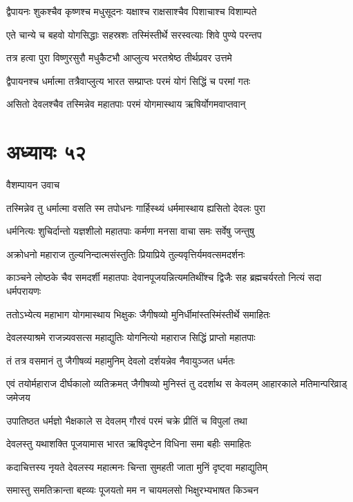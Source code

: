\twolineshloka
{द्वैपायनः शुकश्चैव कृष्णश्च मधुसूदनः}
{यक्षाश्च राक्षसाश्चैव पिशाचाश्च विशाम्पते}


\twolineshloka
{एते चान्ये च बहवो योगसिद्धाः सहस्रशः}
{तस्मिंस्तीर्थे सरस्वत्याः शिवे पुण्ये परन्तप}


\twolineshloka
{तत्र हत्वा पुरा विष्णुरसुरौ मधुकैटभौ}
{आप्लुत्य भरतश्रेष्ठ तीर्थप्रवर उत्तमे}


\twolineshloka
{द्वैपायनश्च धर्मात्मा तत्रैवाप्लुत्य भारत}
{सम्प्राप्तः परमं योगं सिद्धिं च परमां गतः}


\twolineshloka
{असितो देवलश्चैव तस्मिन्नेव महातपाः}
{परमं योगमास्थाय ऋषिर्योगमवाप्तवान्}


\chapter{अध्यायः ५२}
\twolineshloka
{वैशम्पायन उवाच}
{}


\twolineshloka
{तस्मिन्नेव तु धर्मात्मा वसति स्म तपोधनः}
{गार्हिस्थ्यं धर्ममास्थाय ह्यसितो देवलः पुरा}


\twolineshloka
{धर्मनित्यः शुचिर्दान्तो यज्ञशीलो महातपाः}
{कर्मणा मनसा वाचा समः सर्वेषु जन्तुषु}


\twolineshloka
{अक्रोधनो महाराज तुल्यनिन्दात्मसंस्तुतिः}
{प्रियाप्रिये तुल्यवृत्तिर्यमवत्समदर्शनः}


\threelineshloka
{काञ्चने लोष्ठके चैव समदर्शी महातपाः}
{देवानपूजयन्नित्यमतिथींश्च द्विजैः सह}
{ब्रह्मचर्यरतो नित्यं सदा धर्मपरायणः}


\twolineshloka
{ततोऽभ्येत्य महाभाग योगमास्थाय भिक्षुकः}
{जैगीषव्यो मुनिर्धीमांस्तस्मिंस्तीर्थे समाहितः}


\twolineshloka
{देवलस्याश्रमे राजन्न्यवसत्स महाद्युतिः}
{योगनित्यो महाराज सिद्धिं प्राप्तो महातपाः}


\twolineshloka
{तं तत्र वसमानं तु जैगीषव्यं महामुनिम्}
{देवलो दर्शयन्नेव नैवायुञ्जत धर्मतः}


एवं तयोर्महाराज दीर्घकालो व्यतिक्रमत्
\twolineshloka
{जैगीषव्यो मुनिस्तं तु ददर्शाथ स केवलम्}
{आहारकाले मतिमान्परिव्राड् जमेजय}


\twolineshloka
{उपातिष्ठत धर्मज्ञो भैक्षकाले स देवलम्}
{गौरवं परमं चक्रे प्रीतिं च विपुलां तथा}


\twolineshloka
{देवलस्तु यथाशक्ति पूजयामास भारत}
{ऋषिदृष्टेन विधिना समा बहीः समाहितः}


\twolineshloka
{कदाचित्तस्य नृयते देवलस्य महात्मनः}
{चिन्ता सुमहती जाता मुनिं दृष्ट्वा महाद्युतिम्}


\twolineshloka
{समास्तु समतिक्रान्ता बह्व्यः पूजयतो मम}
{न चायमलसो भिक्षुरभ्यभाषत किञ्चन}


